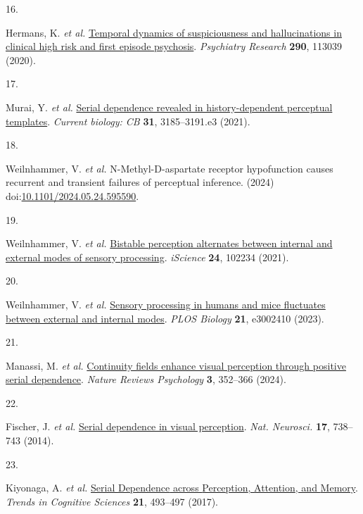 \documentclass[
]{article}
\newlength{\cslhangindent}
\newlength{\csllabelwidth}
\newlength{\cslentryspacingunit} %
\newenvironment{CSLReferences}[2] %
 {%
  \setlength{\parindent}{0pt}
  \ifodd #1
  \let\oldpar\par
  \def\par{\hangindent=\cslhangindent\oldpar}
  \fi
  \setlength{\parskip}{#2\cslentryspacingunit}
 }%
 {}
\newcommand{\CSLLeftMargin}[1]{\parbox[t]{\csllabelwidth}{#1}}
\newcommand{\CSLRightInline}[1]{\parbox[t]{\linewidth - \csllabelwidth}{#1}\break}
\begin{document}
\begin{CSLReferences}{0}{0}
\leavevmode{}%
\CSLLeftMargin{16. }%
\CSLRightInline{Hermans, K. \emph{et al.}
\href{https://doi.org/10.1016/j.psychres.2020.113039}{Temporal dynamics
of suspiciousness and hallucinations in clinical high risk and first
episode psychosis}. \emph{Psychiatry Research} \textbf{290}, 113039
(2020).}

\leavevmode{}%
\CSLLeftMargin{17. }%
\CSLRightInline{Murai, Y. \emph{et al.}
\href{https://doi.org/10.1016/j.cub.2021.05.006}{Serial dependence
revealed in history-dependent perceptual templates}. \emph{Current
biology: CB} \textbf{31}, 3185--3191.e3 (2021).}

\leavevmode{}%
\CSLLeftMargin{18. }%
\CSLRightInline{Weilnhammer, V. \emph{et al.} N-{Methyl}-{D}-aspartate
receptor hypofunction causes recurrent and transient failures of
perceptual inference. (2024)
doi:\href{https://doi.org/10.1101/2024.05.24.595590}{10.1101/2024.05.24.595590}.}

\leavevmode{}%
\CSLLeftMargin{19. }%
\CSLRightInline{Weilnhammer, V. \emph{et al.}
\href{https://doi.org/10.1016/j.isci.2021.102234}{Bistable perception
alternates between internal and external modes of sensory processing}.
\emph{iScience} \textbf{24}, 102234 (2021).}

\leavevmode{}%
\CSLLeftMargin{20. }%
\CSLRightInline{Weilnhammer, V. \emph{et al.}
\href{https://doi.org/10.1371/journal.pbio.3002410}{Sensory processing
in humans and mice fluctuates between external and internal modes}.
\emph{PLOS Biology} \textbf{21}, e3002410 (2023).}

\leavevmode{}%
\CSLLeftMargin{21. }%
\CSLRightInline{Manassi, M. \emph{et al.}
\href{https://doi.org/10.1038/s44159-024-00297-x}{Continuity fields
enhance visual perception through positive serial dependence}.
\emph{Nature Reviews Psychology} \textbf{3}, 352--366 (2024).}

\leavevmode{}%
\CSLLeftMargin{22. }%
\CSLRightInline{Fischer, J. \emph{et al.}
\href{https://doi.org/10.1038/nn.3689}{Serial dependence in visual
perception}. \emph{Nat. Neurosci.} \textbf{17}, 738--743 (2014).}

\leavevmode{}%
\CSLLeftMargin{23. }%
\CSLRightInline{Kiyonaga, A. \emph{et al.}
\href{https://doi.org/10.1016/j.tics.2017.04.011}{Serial {Dependence}
across {Perception}, {Attention}, and {Memory}}. \emph{Trends in
Cognitive Sciences} \textbf{21}, 493--497 (2017).}


\end{CSLReferences}
\end{document}
